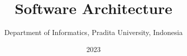 \documentclass[a4paper,12pt]{book}
\begin{document}
\title{Software Architecture}
\author{Department of Informatics, Pradita University, Indonesia}
\date{2023}

\frontmatter
\maketitle
\tableofcontents

\mainmatter















\backmatter
\end{document}
